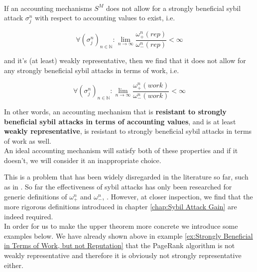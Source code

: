 \begin{theorem}[]\ \\
\label{th:Representativeness Theorem}
\noindent{}If an accounting mechanisms $S^M$ does not allow for a strongly beneficial sybil attack $\sigma_j^n$ with respect to accounting values to exist, i.e.

\[
\forall\left(\sigma_j^n\right)_{n\in\mathbb{N}}:\lim\limits_{n\rightarrow\infty}\frac{\omega^{n}_{+}(rep)}{\omega^{n}_{-}(rep)}<\infty
\]

\noindent{}and it's (at least) weakly representative, then we find that it does not allow for any strongly beneficial sybil attacks in terms of work, i.e.

\[
\forall\left(\sigma_j^n\right)_{n\in\mathbb{N}}:\lim\limits_{n\rightarrow\infty}\frac{\omega^{n}_{+}(work)}{\omega^{n}_{-}(work)}<\infty
\]

\noindent{}In other words, an accounting mechanism that is \textbf{resistant to strongly beneficial sybil attacks in terms of accounting values}, and is at least \textbf{weakly representative}, is resistant to strongly beneficial sybil attacks in terms of work as well.\vspace{1em}\\ 

\noindent{}An ideal accounting mechanism will satisfy both of these properties and if it doesn't, we will consider it an inappropriate choice.
\end{theorem}

\noindent{}This is a problem that has been widely disregarded in the literature so far, such as in \cite{A Random Walk Based Trust Ranking in Distributed Systems}. So far the effectiveness of sybil attacks has only been researched for generic definitions of $\omega_{+}^{n}$ and $\omega_{-}^{n}$, \cite{On the Sybil-Proofness of Accounting Mechanisms}. However, at closer inspection, we find that the more rigorous definitions introduced in chapter \ref{chap:Sybil Attack Gain} are indeed required. \vspace{1em}\\ 

\noindent{}In order for us to make the upper theorem more concrete we introduce some examples below. We have already shown above in example \ref{ex:Strongly Beneficial in Terms of Work, but not Reputation} that the PageRank algorithm is not weakly representative and therefore it is obviously not strongly representative either.\vspace{1em}\\



